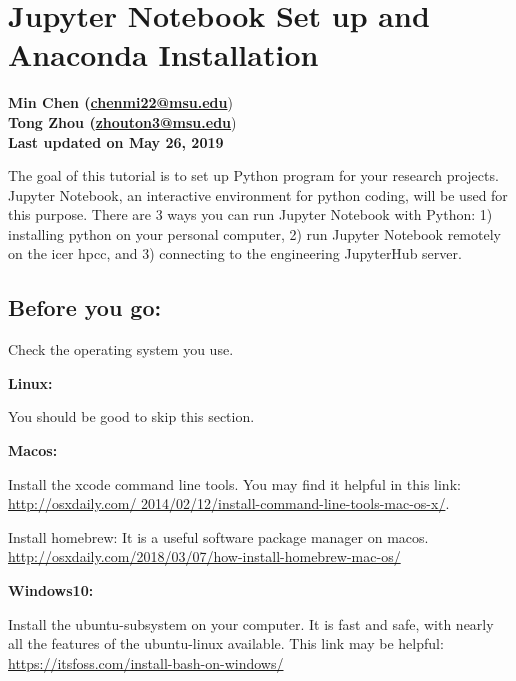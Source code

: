 \documentclass[12pt]{article}   	%
\begin{document}
\section*{Jupyter Notebook Set up and Anaconda Installation}

\textbf{Min Chen (\href{chenmi22@msu.edu}{chenmi22@msu.edu}}) \\ 
\textbf{Tong Zhou (\href{zhouton3@msu.edu}{zhouton3@msu.edu}}) \\ 
\textbf{Last updated on May 26, 2019}

The goal of this tutorial is to set up Python program for your research projects. Jupyter Notebook, an interactive environment for python coding, will be used for this purpose. 
There are 3 ways you can run Jupyter Notebook with Python: 1) installing python on your personal computer, 2) run Jupyter Notebook remotely on the icer hpcc, and 3) connecting to the engineering JupyterHub server.

\subsection*{Before you go:}
Check the operating system you use. 

\textbf{Linux:} 

You should be good to skip this section.

\textbf{Macos:} 

Install the xcode command line tools.  You may find it helpful in this link: \href{http://osxdaily.com/2014/02/12/install-command-line-tools-mac-os-x/}{http://osxdaily.com/ 2014/02/12/install-command-line-tools-mac-os-x/}. 

Install homebrew: It is a useful software package manager on macos.  \href{http://osxdaily.com/2018/03/07/how-install-homebrew-mac-os/}{http://osxdaily.com/2018/03/07/how-install-homebrew-mac-os/}

\textbf{Windows10:}

Install the ubuntu-subsystem on your computer. It is fast and safe, with nearly all the features of the ubuntu-linux available. This link may be helpful: \href{https://itsfoss.com/install-bash-on-windows/}{https://itsfoss.com/install-bash-on-windows/}
\end{document}
